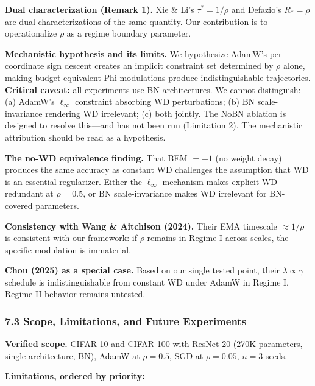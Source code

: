 \documentclass[
]{article}
\begin{document}
\textbf{Dual characterization (Remark 1).} Xie \& Li's
\(\tau^* = 1/\rho\) and Defazio's \(R_* = \rho\) are dual
characterizations of the same quantity. Our contribution is to
operationalize \(\rho\) as a regime boundary parameter.

\textbf{Mechanistic hypothesis and its limits.} We hypothesize AdamW's
per-coordinate sign descent creates an implicit constraint set
determined by \(\rho\) alone, making budget-equivalent Phi modulations
produce indistinguishable trajectories. \textbf{Critical caveat:} all
experiments use BN architectures. We cannot distinguish: (a) AdamW's
\(\ell_\infty\) constraint absorbing WD perturbations; (b) BN
scale-invariance rendering WD irrelevant; (c) both jointly. The NoBN
ablation is designed to resolve this---and has not been run (Limitation
2). The mechanistic attribution should be read as a hypothesis.

\textbf{The no-WD equivalence finding.} That BEM \(= -1\) (no weight
decay) produces the same accuracy as constant WD challenges the
assumption that WD is an essential regularizer. Either the
\(\ell_\infty\) mechanism makes explicit WD redundant at \(\rho = 0.5\),
or BN scale-invariance makes WD irrelevant for BN-covered parameters.

\textbf{Consistency with Wang \& Aitchison (2024).} Their EMA timescale
\(\approx 1/\rho\) is consistent with our framework: if \(\rho\) remains
in Regime I across scales, the specific modulation is immaterial.

\textbf{Chou (2025) as a special case.} Based on our single tested
point, their \(\lambda \propto \gamma\) schedule is indistinguishable
from constant WD under AdamW in Regime I. Regime II behavior remains
untested.

\hypertarget{scope-limitations-and-future-experiments}{%
\subsubsection{7.3 Scope, Limitations, and Future
Experiments}\label{scope-limitations-and-future-experiments}}

\textbf{Verified scope.} CIFAR-10 and CIFAR-100 with ResNet-20 (270K
parameters, single architecture, BN), AdamW at \(\rho = 0.5\), SGD at
\(\rho = 0.05\), \(n = 3\) seeds.

\textbf{Limitations, ordered by priority:}
\end{document}
